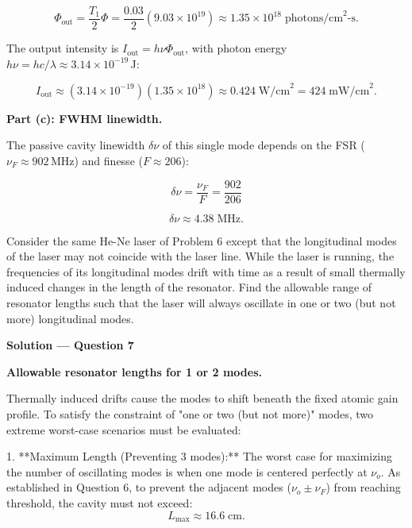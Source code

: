 \begin{equation*}
  \Phi_{\text{out}} = \frac{T_1}{2}\Phi = \frac{0.03}{2}(9.03\times10^{19}) \approx 1.35\times10^{18}\;\text{photons/cm}^{2}\text{-s}.
\end{equation*}

The output intensity is $I_{\text{out}} = h\nu\Phi_{\text{out}}$, with photon energy $h\nu = hc/\lambda \approx 3.14\times10^{-19}$\,J:

\begin{equation*}
  \boxed{I_{\text{out}} \approx (3.14\times10^{-19})(1.35\times10^{18}) \approx 0.424\;\text{W/cm}^{2} = 424\;\text{mW/cm}^{2}.}
\end{equation*}

\textbf{Part (c): FWHM linewidth.}

The passive cavity linewidth $\delta\nu$ of this single mode depends on the FSR ($\nu_F \approx 902$\,MHz) and finesse ($F \approx 206$):

\begin{equation*}
  \delta\nu = \frac{\nu_F}{F} = \frac{902}{206}
\end{equation*}

\begin{equation*}
  \boxed{\delta\nu \approx 4.38\;\text{MHz}.}
\end{equation*}


\begin{question}[Question 7]Consider the same He-Ne laser of Problem 6 except that the longitudinal
modes of the laser may not coincide with the laser line. While the laser is running, the
frequencies of its longitudinal modes drift with time as a result of small thermally induced
changes in the length of the resonator. Find the allowable range of resonator lengths such that
the laser will always oscillate in one or two (but not more) longitudinal modes.
\end{question}

\textbf{\large Solution --- Question 7}

\textbf{Allowable resonator lengths for 1 or 2 modes.}

Thermally induced drifts cause the modes to shift beneath the fixed atomic gain profile. To satisfy the constraint of "one or two (but not more)" modes, two extreme worst-case scenarios must be evaluated:

1. **Maximum Length (Preventing 3 modes):** The worst case for maximizing the number of oscillating modes is when one mode is centered perfectly at $\nu_o$. As established in Question 6, to prevent the adjacent modes ($\nu_o \pm \nu_F$) from reaching threshold, the cavity must not exceed:
\begin{equation*}
  L_{\max} \approx 16.6\;\text{cm}.
\end{equation*}

